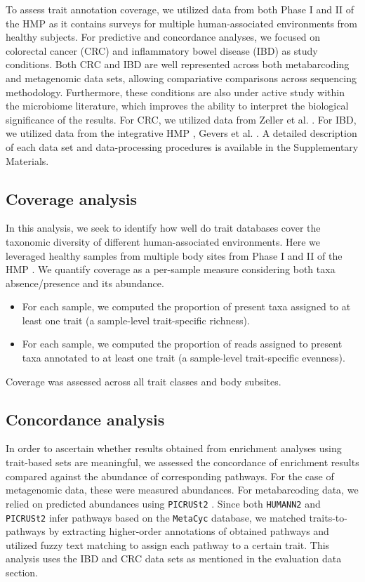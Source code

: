 \documentclass{bmcart}
\begin{document}
\noindent To assess trait annotation coverage, we utilized data from both Phase I and II of the HMP \cite{consortium2012structure} as it contains surveys for multiple human-associated environments from healthy subjects. For predictive and concordance analyses, we focused on colorectal cancer (CRC) and inflammatory bowel disease (IBD) as study conditions. Both CRC and IBD are well represented across both metabarcoding and metagenomic data sets, allowing compariative comparisons across sequencing methodology. Furthermore, these conditions are also under active study within the microbiome literature, which improves the ability to interpret the biological significance of the results. For CRC, we utilized data from Zeller et al. \cite{zeller2014potential}. For IBD, we utilized data from the integrative HMP \cite{proctor2019integrative}, Gevers et al. \cite{gevers2014treatmentnaive}. A detailed description of each data set and data-processing procedures is available in the Supplementary Materials. 

\subsection*{Coverage analysis}  

In this analysis, we seek to identify how well do trait databases cover the taxonomic diversity of different human-associated environments. Here we leveraged healthy samples from multiple body sites from Phase I and II of the HMP \cite{consortium2012structure}. We quantify coverage as a per-sample measure considering both taxa absence/presence and its abundance.   
\begin{itemize}
    \item For each sample, we computed the proportion of present taxa assigned to at least one trait (a sample-level trait-specific richness). 
    \item For each sample, we computed the proportion of reads assigned to present taxa annotated to at least one trait (a sample-level trait-specific evenness).  
\end{itemize}

\noindent Coverage was assessed across all trait classes and body subsites. 

\subsection*{Concordance analysis}

In order to ascertain whether results obtained from enrichment analyses using trait-based sets are meaningful, we assessed the concordance of enrichment results compared against the abundance of corresponding pathways. For the case of metagenomic data, these were measured abundances. For metabarcoding data, we relied on predicted abundances using \texttt{PICRUSt2} \cite{douglas2020picrust2}. Since both \texttt{HUMANN2} and \texttt{PICRUSt2} infer pathways based on the \texttt{MetaCyc} \cite{caspi2020metacyc} database, we matched traits-to-pathways by extracting higher-order annotations of obtained pathways and utilized fuzzy text matching to assign each pathway to a certain trait. This analysis uses the IBD and CRC data sets as mentioned in the evaluation data section.  
\end{document}
